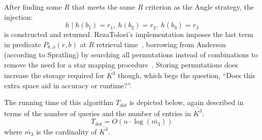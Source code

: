 After finding some $R$ that meets the same $R$ criterion as the Angle strategy, the injection:
\begin{equation}
    h \mid h(b_1) = r_1, \ h(b_2) = r_2, \ h(b_3) = r_3
\end{equation}
is constructed and returned.
RezaToloei's implementation imposes the last term in predicate $P_{\theta, \phi}(r, b)$ at $R$ retrieval
time~\cite{toloei:compositeIdentification}, borrowing from Anderson (according to Spratling) by searching all
permutations instead of combinations to remove the need for a star mapping
procedure~\cite{anderson:autonomousStarSensing}.
Storing permutations does increase the storage required for $\bar{K^3}$ though, which begs the question,
``Does this extra space aid in accuracy or runtime?''.

%

The running time of this algorithm $T_{dot}$ is depicted below, again described in terms of the number of queries
and the number of entries in $\bar{K^3}$:
\begin{equation}\label{eq:dotComplexity}
    T_{dot} = O\left( n \cdot \log(\bar{m_3}) \right)
\end{equation}
where $\bar{m_3}$ is the cardinality of $\bar{K^3}$.


